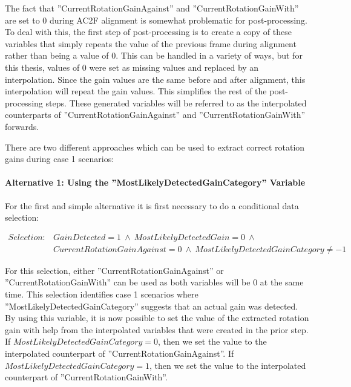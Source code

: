 The fact that ''CurrentRotationGainAgainst'' and ''CurrentRotationGainWith'' are set to 0 during AC2F alignment is somewhat problematic for post-processing. To deal with this, the first step of post-processing is to create a copy of these variables that simply repeats the value of the previous frame during alignment rather than being a value of 0. This can be handled in a variety of ways, but for this thesis, values of 0 were set as missing values and replaced by an interpolation. Since the gain values are the same before and after alignment, this interpolation will repeat the gain values. This simplifies the rest of the post-processing steps. These generated variables will be referred to as the interpolated counterparts of ''CurrentRotationGainAgainst'' and ''CurrentRotationGainWith'' forwards. 

There are two different approaches which can be used to extract correct rotation gains during case 1 scenarios:

\paragraph{Alternative 1: Using the ''MostLikelyDetectedGainCategory'' Variable}
For the first and simple alternative it is first necessary to do a conditional data selection:

\begin{align*}
Selection: & GainDetected = 1 \ \land \ MostLikelyDetectedGain = 0 \ \land \nonumber \\ & CurrentRotationGainAgainst = 0 \ \land \ MostLikelyDetectedGainCategory \neq -1 \nonumber
\end{align*}

For this selection, either ''CurrentRotationGainAgainst'' or ''CurrentRotationGainWith'' can be used as both variables will be 0 at the same time. This selection identifies case 1 scenarios where  ''MostLikelyDetectedGainCategory'' suggests that an actual gain was detected. By using this variable, it is now possible to set the value of the extracted rotation gain with help from the interpolated variables that were created in the prior step. If $MostLikelyDetectedGainCategory = 0$, then we set the value to the interpolated counterpart of ''CurrentRotationGainAgainst''. If \\ $MostLikelyDetectedGainCategory = 1$, then we set the value to the interpolated counterpart of ''CurrentRotationGainWith''. 

